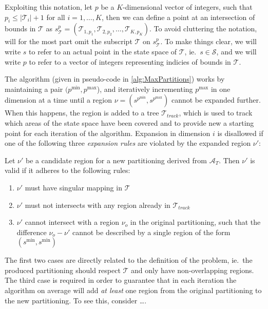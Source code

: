 Exploiting this notation, let $p$ be a $K$-dimensional vector of integers, such
that $p_i \leq |\mathcal{T}_i| + 1$ for all $i = 1,\ldots,K$, then we can define
a point at an intersection of bounds in $\mathcal{T}$ as $s^{p}_{\mathcal{T}} =
(\mathcal{T}_{1,p_1}, \mathcal{T}_{2,p_2}, \ldots, \mathcal{T}_{K,p_K})$. To
avoid cluttering the notation, will for the most part omit the subscript
$\mathcal{T}$ on $s^{p}_{\mathcal{T}}$. To make things clear, we will write $s$
to refer to an actual point in the state space of $\mathcal{T}$, ie.\ $s \in
\mathcal{S}$, and we will write $p$ to refer to a vector of integers
representing indicies of bounds in $\mathcal{T}$.

The algorithm (given in pseudo-code in \cref{alg:MaxPartitions}) works
by maintaining a pair $(p^{\min}, p^{\max}$), and iteratively incrementing
$p^{\max}$ in one dimension at a time until a region $\nu = (s^{p^{\min}},
s^{p^{\max}})$ cannot be expanded further. When this happens, the region is
added to a tree $\mathcal{T}_{track}$, which is used to track which areas of the
state space have been covered and to provide new a starting point for each
iteration of the algorithm. Expansion in dimension $i$ is disallowed if one of
the following three \textit{expansion rules} are violated by the expanded region
$\nu'$:

\begin{definition}\label{def:expansionRules}
    Let $\nu'$ be a candidate region for a new partitioning derived from
    $\mathcal{A}_{T}$. Then $\nu'$ is valid if it adheres to the following rules:

    \begin{enumerate}
        \item $\nu'$ must have singular mapping in $\mathcal{T}$
        \item $\nu'$ must not intersects with any region already in
            $\mathcal{T}_{track}$
        \item $\nu'$ cannot intersect with a region $\nu_{o}$ in the original
            partitioning, such that the difference $\nu_{o} - \nu'$ cannot be
            described by a single region of the form $(s^{\min}, s^{\min})$
    \end{enumerate}
\end{definition}

\noindent The first two cases are directly related to the definition of the
problem, ie.\ the produced partitioning should respect $\mathcal{T}$ and only
have non-overlapping regions. The third case is required in order to guarantee
that in each iteration the algorithm on average will add \textit{at least} one
region from the original partitioning to the new partitioning. To see this,
consider \ldots{}.


